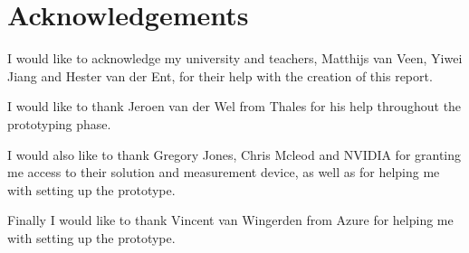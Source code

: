 \section{Acknowledgements}
I would like to acknowledge my university and teachers, Matthijs van Veen, Yiwei Jiang and Hester van der Ent, for their help with the creation of this report.

I would like to thank Jeroen van der Wel from Thales for his help throughout the prototyping phase.

I would also like to thank Gregory Jones, Chris Mcleod and NVIDIA for granting me access to their solution and measurement device, as well as for helping me with setting up the prototype.

Finally I would like to thank Vincent van Wingerden from Azure for helping me with setting up the prototype.